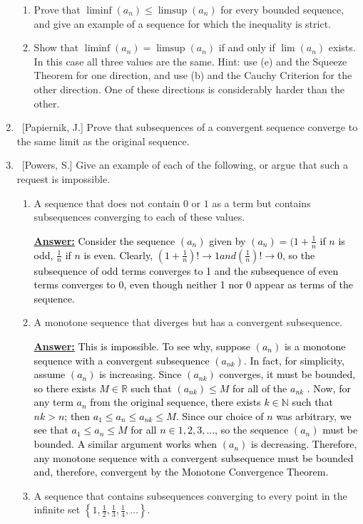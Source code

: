 \documentclass[10pt]{article}
\theoremstyle{definition}
\begin{document}
\begin{enumerate}
\begin{enumerate}
	\item  Prove that $\liminf{(a_n)} \leq \limsup{(a_n)}$ for every bounded sequence, and give an example of a sequence for which the inequality is strict.
	
	\item  Show that $\liminf{(a_n)} = \limsup{(a_n)}$ if and only if $\lim{(a_n)}$ exists.  In this case all three values are the same.  Hint: use (e) and the Squeeze Theorem for one direction, and use (b) and the Cauchy Criterion for the other direction.  One of these directions is considerably harder than the other.
	
	\end{enumerate}
	

\item  ~[Papiernik, J.] Prove that subsequences of a convergent sequence converge to the same limit as the original sequence.
	

\item  ~[Powers, S.] Give an example of each of the following, or argue that such a request is impossible.

	\begin{enumerate}
	
	\item  A sequence that does not contain $0$ or $1$ as a term but contains subsequences converging to each of these values.
 
 \textbf{\underline{Answer:}}
 \textcolor{black}{Consider the sequence $(a_n)$ given by $(a_n) = (1+\frac{1}{n}$ if $n$ is odd, $\frac{1}{n}$ if $n$ is even.  Clearly, $(1+\frac{1}{n})! \rightarrow 1 and (\frac{1}{n})! \rightarrow 0$, so the subsequence of odd terms converges to 1 and the subsequence of even terms converges to 0, even though neither 1 nor 0 appear as terms of the sequence.} 
	
	\item  A monotone sequence that diverges but has a convergent subsequence.
	
 \textbf{\underline{Answer:}}
 \textcolor{black}{This is impossible.  To see why, suppose $(a_n)$ is a monotone sequence with a convergent subsequence $(a_{nk})$. In fact, for simplicity, assume $(a_n)$ is increasing. Since $(a_{nk})$ converges, it must be bounded, so there exists $M \in \mathbb{R}$ such that $(a_{nk}) \leq M$ for all of the $a_{nk}$ . Now, for any term $a_n$ from the original sequence, there exists $k \in \mathbb{N}$ such that $nk > n$; then $a_1 \leq a_n \leq a_{nk} \leq M$. Since our choice of $n$ was arbitrary, we see that $a_1 \leq a_n \leq M$ for all $n \in {1, 2, 3, . . .}$, so the sequence $(a_n)$ must be bounded. A similar argument works when $(a_n)$ is decreasing. Therefore, any monotone sequence with a convergent subsequence must be bounded and, therefore, convergent by the Monotone Convergence Theorem. }
	\item  A sequence that contains subsequences converging to every point in the infinite set $\left\{ 1, \frac{1}{2}, \frac{1}{3}, \frac{1}{4}, \ldots \right\}$.
 

\end{enumerate}
\end{enumerate}
\end{document}
